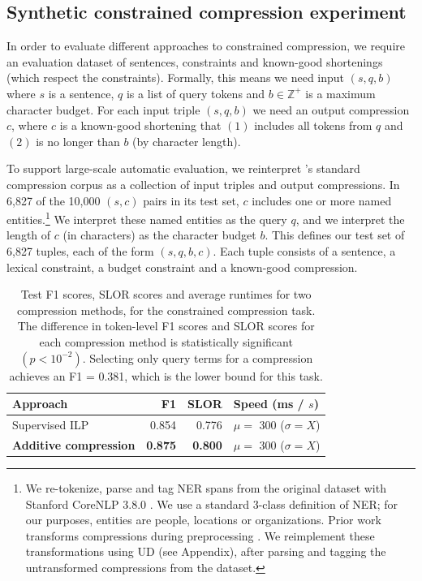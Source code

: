 \documentclass[11pt,a4paper]{article}
\begin{document}
\subsection{Synthetic constrained compression experiment}

In order to evaluate different approaches to constrained compression, we require an evaluation dataset of sentences, constraints and known-good shortenings (which respect the constraints). Formally, this means we need input $(s, q, b)$ where $s$ is a sentence, $q$ is a list of query tokens and $b \in \mathbb{Z}^{+}$ is a maximum character budget. For each input triple $(s,q,b)$ we need an output compression $c$, where $c$ is a known-good shortening that $(1)$ includes all tokens from $q$ and $(2)$ is no longer than $b$ (by character length). 

To support large-scale automatic evaluation, we reinterpret 
\citeauthor{filippova2013overcoming}'s
standard compression corpus
as a collection of input triples and output compressions.
In 6,827 of the 10,000 $(s,c)$ pairs in its test set,
$c$ includes one or more named entities.\footnote{We re-tokenize, parse and tag NER spans from the original dataset with Stanford CoreNLP 3.8.0 \cite{corenlp}. We use a standard 3-class definition of NER; for our purposes, entities are people, locations or organizations. Prior work transforms compressions during preprocessing \cite{filippova2013overcoming}. We reimplement these transformations using UD (see Appendix), after parsing and tagging the untransformed compressions from the dataset.}
We interpret these named entities as the query $q$,
and we interpret the length of $c$ (in characters) as the character budget $b$.
This defines our test set of 6,827 tuples, each of the form $(s,q,b,c)$. Each tuple consists of a sentence, a lexical constraint, a budget constraint and a
known-good compression.

\begin{table}[]
\begin{tabular}{lrrl}
\centering
Approach & F1 & SLOR &  Speed {\small (ms / $s$)}  \\ \hline
Supervised ILP  &  {\small 0.854}   &  {\small 0.776 }  & {\small $\mu=$ 300} ({\small $ \sigma=X$}) \\
\textbf{Additive compression} &  {\small \textbf{0.875}}  & {\small \textbf{0.800} }& {\small $\mu=$ 300} ({\small $ \sigma=X$}) \\
\end{tabular}
\caption{Test F1 scores, SLOR scores and average runtimes for two compression methods, for the constrained compression task. The difference in token-level F1 scores and SLOR scores for each compression method is statistically significant {\small $(p < 10^{-2})$}. Selecting only query terms for a compression achieves an F1 = 0.381, which is the lower bound for this task.}
\label{t:results}
\end{table}
\end{document}
